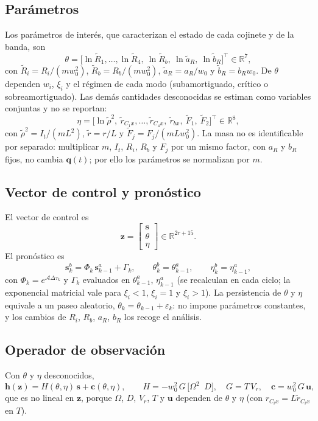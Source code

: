 \subsection{Parámetros}

Los parámetros de interés, que caracterizan el estado de cada cojinete y de la banda, son
\[
\theta=\big[\ln\tilde R_1,\ldots,\ln\tilde R_4,\ \ln\tilde R_b,\ \ln\tilde a_R,\ \ln\tilde b_R\big]^\top\in\mathbb R^{7},
\]
con $\tilde R_i=R_i/(mw_0^2)$, $\tilde R_b=R_b/(mw_0^2)$, $\tilde a_R=a_R/w_0$ y $\tilde b_R=b_Rw_0$. De $\theta$ dependen $w_i$, $\xi_i$ y el régimen de cada modo (subamortiguado, crítico o sobreamortiguado). Las demás cantidades desconocidas se estiman como variables conjuntas y no se reportan:
\[
\eta=\big[\ln\tilde\rho^2,\ \tilde r_{C_1x},\ldots,\tilde r_{C_4x},\ \tilde r_{bx},\ \tilde F_1,\ \tilde F_2\big]^\top\in\mathbb R^{8},
\]
con $\tilde\rho^2=I_t/(mL^2)$, $\tilde r=r/L$ y $\tilde F_j=F_j/(mLw_0^2)$. La masa no es identificable por separado: multiplicar $m$, $I_t$, $R_i$, $R_b$ y $F_j$ por un mismo factor, con $a_R$ y $b_R$ fijos, no cambia $\mathbf q(t)$; por ello los parámetros se normalizan por $m$.

\subsection{Vector de control y pronóstico}

El vector de control es
\[
\mathbf z=\begin{bmatrix}\mathbf s\\\theta\\\eta\end{bmatrix}\in\mathbb R^{2r+15}.
\]
El pronóstico es
\[
\mathbf s^b_k=\Phi_k\,\mathbf s^a_{k-1}+\Gamma_k,\qquad
\theta^b_k=\theta^a_{k-1},\qquad
\eta^b_k=\eta^a_{k-1},
\]
con $\Phi_k=e^{\mathcal A\Delta\tau_k}$ y $\Gamma_k$ evaluados en $\theta^a_{k-1}$, $\eta^a_{k-1}$ (se recalculan en cada ciclo; la exponencial matricial vale para $\xi_i<1$, $\xi_i=1$ y $\xi_i>1$). La persistencia de $\theta$ y $\eta$ equivale a un paseo aleatorio, $\theta_k=\theta_{k-1}+\varepsilon_k$: no impone parámetros constantes, y los cambios de $R_i$, $R_b$, $a_R$, $b_R$ los recoge el análisis.

\subsection{Operador de observación}

Con $\theta$ y $\eta$ desconocidos,
\[
\mathbf h(\mathbf z)=H(\theta,\eta)\,\mathbf s+\mathbf c(\theta,\eta),\qquad
H=-w_0^2\,G\,\big[\Omega^2\;\;D\big],\quad G=T\,V_r,\quad \mathbf c=w_0^2\,G\,\mathbf u,
\]
que es no lineal en $\mathbf z$, porque $\Omega$, $D$, $V_r$, $T$ y $\mathbf u$ dependen de $\theta$ y $\eta$ (con $r_{C_ix}=L\tilde r_{C_ix}$ en $T$).

